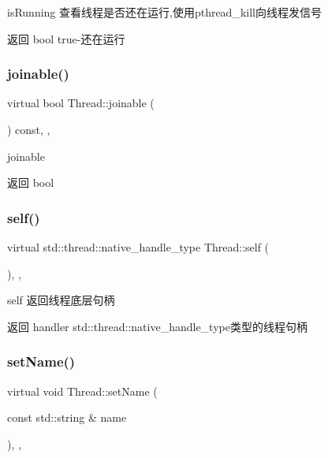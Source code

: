 is\+Running 查看线程是否还在运行,使用pthread\+\_\+kill向线程发信号 

\begin{DoxyReturn}{返回}
bool true-\/还在运行 
\end{DoxyReturn}
\mbox{\label{classThread_a86d1c278c0b9fea63037c437a909064f}} 
\subsubsection{\texorpdfstring{joinable()}{joinable()}}
{\footnotesize\ttfamily virtual bool Thread\+::joinable (\begin{DoxyParamCaption}{ }\end{DoxyParamCaption}) const\hspace{0.3cm}{\ttfamily [inline]}, {\ttfamily [final]}, {\ttfamily [virtual]}}



joinable 

\begin{DoxyReturn}{返回}
bool 
\end{DoxyReturn}
\mbox{\label{classThread_a554185abbfacbcc4bf2e953cdddcbbba}} 
\subsubsection{\texorpdfstring{self()}{self()}}
{\footnotesize\ttfamily virtual std\+::thread\+::native\+\_\+handle\+\_\+type Thread\+::self (\begin{DoxyParamCaption}{ }\end{DoxyParamCaption})\hspace{0.3cm}{\ttfamily [inline]}, {\ttfamily [final]}, {\ttfamily [virtual]}}



self 返回线程底层句柄 

\begin{DoxyReturn}{返回}
handler std\+::thread\+::native\+\_\+handle\+\_\+type类型的线程句柄 
\end{DoxyReturn}
\mbox{\label{classThread_ae816904b2a3e248472813e17c2b12a71}} 
\subsubsection{\texorpdfstring{set\+Name()}{setName()}}
{\footnotesize\ttfamily virtual void Thread\+::set\+Name (\begin{DoxyParamCaption}\item[{const std\+::string \&}]{name }\end{DoxyParamCaption})\hspace{0.3cm}{\ttfamily [inline]}, {\ttfamily [final]}, {\ttfamily [virtual]}}



